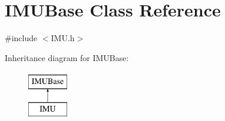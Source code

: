 \hypertarget{class_i_m_u_base}{
\section{IMUBase Class Reference}
\label{class_i_m_u_base}
}


{\ttfamily \#include $<$IMU.h$>$}

Inheritance diagram for IMUBase:\begin{figure}[H]
\begin{center}
\leavevmode
\includegraphics[height=2.000000cm]{class_i_m_u_base}
\end{center}
\end{figure}
